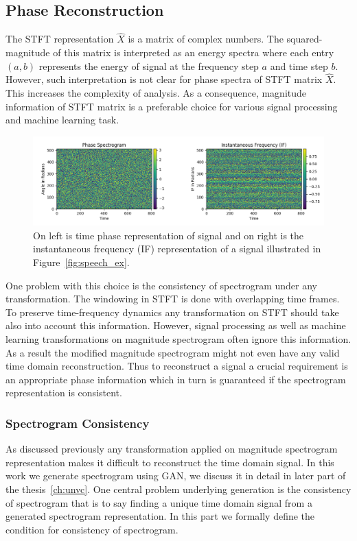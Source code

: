 \subsection{Phase Reconstruction}
\label{subsec:phrecon}
The STFT representation $\hat{X}$ is a matrix of complex numbers. The squared-magnitude of this matrix is interpreted as an energy spectra where each entry $(a,b)$ represents the energy of signal at the frequency step $a$ and time step $b$.
However, such interpretation is not clear for phase spectra of STFT matrix $\hat{X}$. This increases the complexity of analysis. As a consequence, magnitude information of STFT matrix is a preferable choice for various signal processing and machine learning task.

\begin{figure}
    \centering
    \includegraphics[width=0.75\columnwidth, height=0.40\columnwidth]{master_thesis_template/figs/phase_res.png}
    \caption{On left is time phase representation of signal and on right is the instantaneous frequency (IF) representation of a signal illustrated in Figure~\ref{fig:speech_ex}.}
    \label{fig:phase_response}
\end{figure}

One problem with this choice is the consistency of spectrogram under any transformation. The windowing in STFT is done with overlapping time frames. To preserve time-frequency dynamics any transformation on STFT should take also into account this information. However, signal processing as well as machine learning transformations on magnitude spectrogram often ignore this information. As a result the modified magnitude spectrogram might not even have any valid time domain reconstruction. Thus to reconstruct a signal a crucial requirement is an appropriate phase information which in turn is guaranteed if the spectrogram representation is consistent.

\subsubsection{Spectrogram Consistency}
As discussed previously any transformation applied on magnitude spectrogram representation makes it difficult to reconstruct the time domain signal. In this work we generate spectrogram using GAN, we discuss it in detail in later part of the thesis~\ref{ch:unvc}. One central problem underlying generation is the consistency of spectrogram that is to say finding a unique time domain signal from a generated  spectrogram representation. In this part we formally define the condition for consistency of spectrogram.

